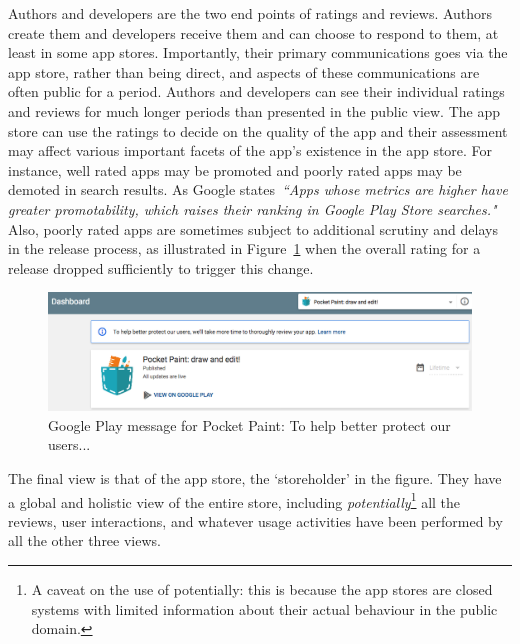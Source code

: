 Authors and developers are the two end points of ratings and reviews. Authors create them and developers receive them and can choose to respond to them, at least in some app stores. %
Importantly, their primary communications goes via the app store, rather than being direct, and aspects of these communications are often public for a period. Authors and developers can see their individual ratings and reviews for much longer periods than presented in the public view. The app store can use the ratings to decide on the quality of the app and their assessment may affect various important facets of the app's existence in the app store. For instance, well rated apps may be promoted and poorly rated apps may be demoted in search results. As Google states~\emph{``Apps whose metrics are higher have greater promotability, which raises their ranking in Google Play Store searches."}~\citep{android_vitals_best_practices} Also, poorly rated apps are sometimes subject to additional scrutiny and delays in the release process, as illustrated in Figure~\ref{fig:pocketpaint-to-help-better-protect-users} when the overall rating for a release dropped sufficiently to trigger this change. %

\begin{figure}[htbp!]
    \centering
    \includegraphics[width=15cm]{images/android-vitals-screenshots/pocketpaint-to-help-better-protect-users.png}
    \caption{Google Play message for Pocket Paint: To help better protect our users...}
    \label{fig:pocketpaint-to-help-better-protect-users}
\end{figure}

The final view is that of the app store, the `storeholder' in the figure. They have a global and holistic view of the entire store, including \textit{potentially}\footnote{A caveat on the use of potentially: this is because the app stores are closed systems with limited information about their actual behaviour in the public domain.} all the reviews, user interactions, and whatever usage activities have been performed by all the other three views. 

